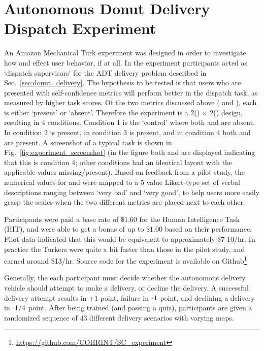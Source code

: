 \section{Autonomous Donut Delivery Dispatch Experiment} \label{sec:exp_results}
An Amazon Mechanical Turk %
experiment was designed in order to investigate how \xQ{} and \xO{} effect user behavior, if at all. In the experiment participants acted as `dispatch supervisors' for the ADT delivery problem described in Sec.~\ref{sec:donut_delivery}. 
The hypothesis to be tested is that users who are presented with self-confidence metrics will perform better in the dispatch task, as measured by higher task scores. 
Of the two \famsec{} metrics discussed above (\xQ{} and \xO), each is either `present' or `absent'. Therefore the experiment is a 2(\xQ) $\times$ 2(\xO) design, resulting in 4 conditions. Condition 1 is the `control' where both \xQ{} and \xO{} are absent. In condition 2 \xQ{} is present, in condition 3 \xO{} is present, and in condition 4 both \xQ{} and \xO{} are present. A screenshot of a typical task is shown in Fig.~\ref{fig:experiment_screenshot} (in the figure both \xQ{} and \xO{} are displayed indicating that this is condition 4; other conditions had an identical layout with the applicable values missing/present). Based on feedback from a pilot study, the numerical values for \xQ{} and \xO{} were mapped to a 5 value Likert-type set of verbal descriptions ranging between `very bad' and `very good', to help users more easily grasp the scales when the two different metrics are placed next to each other.

Participants were paid a base rate of $\$1.60$ for the Human Intelligence Task (HIT), and were able to get a bonus of up to $\$1.00$ based on their performance. Pilot data indicated that this would be equivalent to approximately \$7-10/hr. In practice the Turkers were quite a bit faster than those in the pilot study, and earned around \$13/hr. Source code for the experiment is available on Github\footnote{\url{https://github.com/COHRINT/SC_experiment}}

Generally, the each participant must decide whether the autonomous delivery vehicle should attempt to make a delivery, or decline the delivery. A successful delivery attempt results in $+1$ point, failure in $\-1$ point, and declining a delivery in $\-1/4$ point. After being trained (and passing a quiz), participants are given a randomized sequence of 43 different delivery scenarios with varying maps.  

